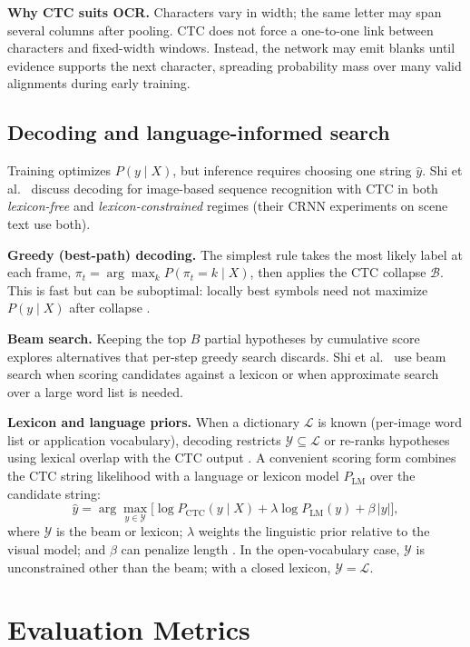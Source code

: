 \documentclass[11pt, a4paper]{article}
\begin{document}
\textbf{Why CTC suits OCR.} Characters vary in width; the same letter may span several columns after pooling. CTC does not force a one-to-one link between characters and fixed-width windows. Instead, the network may emit blanks until evidence supports the next character, spreading probability mass over many valid alignments during early training.

\subsection{Decoding and language-informed search}
Training optimizes $P(y \mid X)$, but inference requires choosing one string $\hat{y}$. Shi et al.\ \cite{shi2016crnn} discuss decoding for image-based sequence recognition with CTC in both \emph{lexicon-free} and \emph{lexicon-constrained} regimes (their CRNN experiments on scene text use both).

\textbf{Greedy (best-path) decoding.} The simplest rule takes the most likely label at each frame, $\pi_t = \arg\max_k P(\pi_t{=}k\mid X)$, then applies the CTC collapse $\mathcal{B}$. This is fast but can be suboptimal: locally best symbols need not maximize $P(y\mid X)$ after collapse \cite{shi2016crnn}.

\textbf{Beam search.} Keeping the top $B$ partial hypotheses by cumulative score explores alternatives that per-step greedy search discards. Shi et al.\ \cite{shi2016crnn} use beam search when scoring candidates against a lexicon or when approximate search over a large word list is needed.

\textbf{Lexicon and language priors.} When a dictionary $\mathcal{L}$ is known (per-image word list or application vocabulary), decoding restricts $\mathcal{Y}\subseteq\mathcal{L}$ or re-ranks hypotheses using lexical overlap with the CTC output \cite{shi2016crnn}. A convenient scoring form combines the CTC string likelihood with a language or lexicon model $P_{\text{LM}}$ over the candidate string:
\[
\hat{y} = \arg\max_{y \in \mathcal{Y}} \Big[ \log P_{\text{CTC}}(y \mid X) + \lambda \log P_{\text{LM}}(y) + \beta\,|y| \Big],
\]
where $\mathcal{Y}$ is the beam or lexicon; $\lambda$ weights the linguistic prior relative to the visual model; and $\beta$ can penalize length \cite{shi2016crnn}. In the open-vocabulary case, $\mathcal{Y}$ is unconstrained other than the beam; with a closed lexicon, $\mathcal{Y}=\mathcal{L}$.

\section{Evaluation Metrics}
\end{document}
